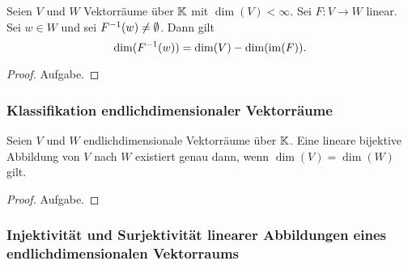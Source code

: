 \begin{klr}
	Seien $ V $ und $ W $ Vektorräume über $ \mathbb K $ mit $ \dim(V) < \infty $. Sei $ F : V \to W $ linear. Sei $ w \in W $ und sei $ F^{-1}(w) \neq \empty \emptyset $. Dann gilt
	\begin{equation}
		\dim(F^{-1}(w)) = \dim(V) - \dim(\operatorname{im}(F)).
	\end{equation}
\end{klr}
\begin{proof}
	Aufgabe.
\end{proof}

\subsubsection{Klassifikation endlichdimensionaler Vektorräume}

\begin{klr}
	Seien $ V $ und $ W $ endlichdimensionale Vektorräume über $ \mathbb K $. Eine lineare bijektive Abbildung von $ V $ nach $ W $ existiert genau dann, wenn $ \dim(V) = \dim(W) $ gilt.
\end{klr}
\begin{proof}
	Aufgabe.
\end{proof}

\subsubsection{Injektivität und Surjektivität linearer Abbildungen eines endlichdimensionalen Vektorraums}

